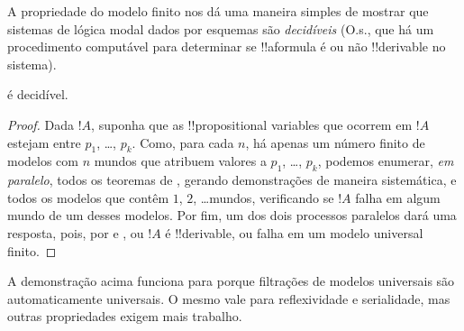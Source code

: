 \documentclass[../../../include/open-logic-section]{subfiles}
\begin{document}

A propriedade do modelo finito nos dá uma maneira simples de mostrar que
sistemas de lógica modal dados por esquemas são \emph{decidíveis} (O.s.\@,
que há um procedimento computável para determinar se !!a{formula} é ou não
!!{derivable} no sistema).

\begin{thm}
   é decidível.
\end{thm}

\begin{proof}
  Dada $!A$, suponha que as !!{propositional variable}s que ocorrem em
  $!A$ estejam entre $p_1$, \dots, $p_k$. Como, para cada $n$, há apenas
  um número finito de modelos com $n$ mundos que atribuem valores a
  $p_1$, \dots, $p_k$, podemos enumerar, \emph{em paralelo}, todos os
  teoremas de , gerando demonstrações de maneira sistemática, e
  todos os modelos que contêm $1$, $2$, \dots mundos, verificando se $!A$
  falha em algum mundo de um desses modelos. Por fim, um dos dois processos
  paralelos dará uma resposta, pois, por 
  e , ou $!A$ é !!{derivable}, ou falha em um modelo
  universal finito.
\end{proof}

A demonstração acima funciona para  porque filtrações de modelos
universais são automaticamente universais. O mesmo vale para reflexividade
e serialidade, mas outras propriedades exigem mais trabalho.
\end{document}
